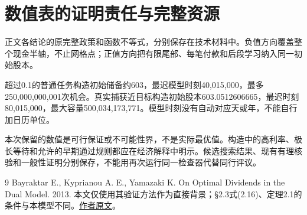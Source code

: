 \documentclass[UTF8,fontset=windows,11pt,a4paper]{ctexart}
\numberwithin{equation}{section}
\begin{document}
\section{数值表的证明责任与完整资源}
正文各结论的原完整政策和函数不等式，分别保存在技术材料中。负值方向覆盖整个现金半轴，不止网格点；正值方向把有限尾部、每笔付款和后段学习纳入同一初始股本。

超过0.1的普通任务构造初始储备约603，最迟模型时刻40,015,000，最多250,000,000,001次机会。真实捕获近目标构造初始股本603.0512606665，最迟时刻80,015,000，最大容量500,034,173,771。模型时刻没有自动对应天或年，不能自行加日历单位。

本次保留的数值是可行保证或不可能性界，不是实际最优值。构造中的高利率、极长等待和允许的早期通过规则都应在经济解释中明示。候选搜索结果、现有有理核验和一般性证明分别保存，不能用再次运行同一检查器代替同行评议。

\begin{thebibliography}{9}
 Bayraktar E., Kyprianou A. E., Yamazaki K. On Optimal Dividends in the Dual Model. 2013. 本文仅使用其验证方法作为直接背景；\S2.3式(2.16)、定理2.1的条件与本模型不同。\href{https://warwick.ac.uk/fac/sci/statistics/staff/academic-research/kyprianou/astin.pdf}{作者原文}。
\end{thebibliography}
\end{document}
